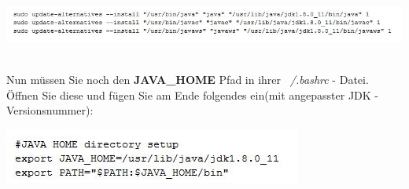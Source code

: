 \documentclass[a4paper, 12pt]{scrreprt}
\begin{document}
\begin{center}
\includegraphics[width=1.1\linewidth]{Grafiken/Liunux_befehle}
\end{center}
\newpage
\ \\
Nun müssen Sie noch den \textbf{JAVA\_HOME} Pfad in ihrer {\it ~/.bashrc} - Datei.\\
Öffnen Sie diese und fügen Sie am Ende folgendes ein(mit angepasster JDK - Versionsnummer):
\begin{center}
\includegraphics[width=0.7\linewidth]{Grafiken/JAVAHome}
\end{center}
\end{document}
